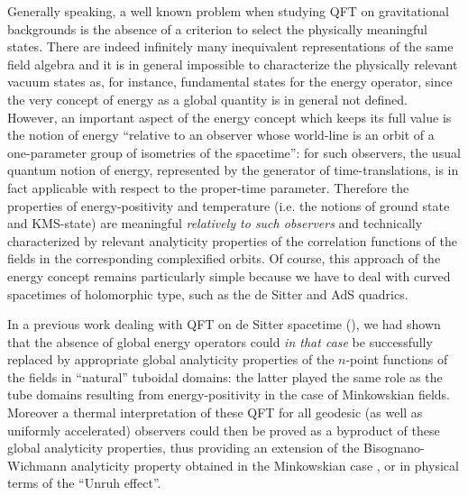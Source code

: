 \documentclass[a4paper,a4paper]{article}
\begin{document}
Generally speaking, a well known problem when studying QFT on
gravitational backgrounds is the absence of a criterion to select
the physically meaningful states. There are indeed infinitely many
inequivalent representations of the same field algebra and it is
in general impossible to characterize the physically relevant
vacuum states as, for instance, fundamental states for the energy
operator, since the very concept of energy as a global quantity
is in general not defined.
However, an important aspect of the energy concept which
keeps its full value is the notion of energy ``relative to
an observer whose world-line is an orbit of a one-parameter
group of isometries of the spacetime'': for such observers,
the usual quantum notion of energy,
represented by the generator of time-translations,
is in fact applicable with respect to the proper-time parameter.
Therefore the properties of
energy-positivity and temperature  (i.e. the notions of
ground state and
KMS-state) are meaningful {\sl relatively to such observers}
and technically characterized by relevant analyticity properties
of the correlation functions of the fields in the corresponding
complexified orbits. Of course, this approach of the energy
concept remains particularly simple because we have to deal
with curved spacetimes of holomorphic type, such as the de Sitter
and AdS quadrics.

In a previous work dealing with
QFT on de Sitter spacetime (\cite{BEM}), we had shown that the
absence of global energy operators could
{\sl in
that case} be successfully replaced
by appropriate global analyticity
properties of the $n$-point functions of the fields
in ``natural'' tuboidal domains: the latter played the same role as
the tube domains resulting from energy-positivity in the
case of Minkowskian fields. Moreover a thermal interpretation
of these QFT for all geodesic (as well as
uniformly accelerated) observers could then be proved
as a byproduct of these global analyticity properties,
thus providing an extension of the
Bisognano-Wichmann analyticity property obtained in
the Minkowskian case \cite{BW}, or in physical terms
of the ``Unruh effect''.
\end{document}
